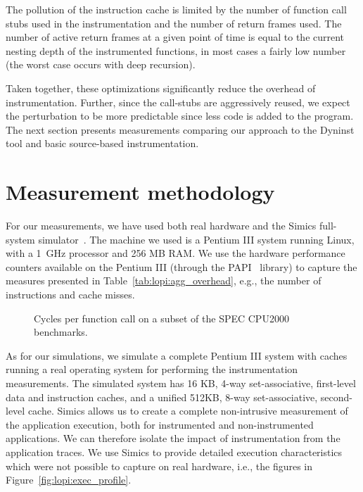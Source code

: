 The pollution of the instruction cache is limited by the number of function
call stubs used in the instrumentation and the number of return frames used.
The number of active return frames at a given point of time is equal to the
current nesting depth of the instrumented functions, in most cases a fairly
low number (the worst case occurs with deep recursion).

Taken together, these optimizations significantly reduce the overhead
of instrumentation. Further, since the call-stubs are aggressively reused, we
expect the perturbation to be more predictable since less code is added to the
program. The next section presents measurements comparing our approach to the
Dyninst tool and basic source-based instrumentation.

\section{Measurement methodology}
\label{sec:lopi:methodology}
For our measurements, we have used both real hardware and the Simics
full-system simulator~\cite{simics}.  The machine we used is a Pentium III
system running Linux, with a 1~GHz processor and 256 MB RAM. We use
the hardware performance counters available on the Pentium III (through the
PAPI~\cite{london2001papi} library) to capture the measures presented in
Table~\ref{tab:lopi:agg_overhead}, e.g., the number of instructions and cache
misses.

\begin{figure*}[htb]
  \begin{center}
  \end{center}
  \caption[Cycles per function call]{Cycles per function call on a subset of
    the SPEC CPU2000 benchmarks.}
  \label{fig:lopi:function_averages}
\end{figure*}

As for our simulations, we simulate a complete Pentium III system with caches
running a real operating system for performing the instrumentation
measurements. The simulated system has 16 KB, 4-way set-associative,
first-level data and instruction caches, and a unified 512KB, 8-way
set-associative, second-level cache. Simics allows us to create a complete
non-intrusive measurement of the application execution, both for instrumented
and non-instrumented applications. We can therefore isolate the impact of
instrumentation from the application traces. We use Simics to provide detailed
execution characteristics which were not possible to capture on real hardware,
i.e., the figures in Figure~\ref{fig:lopi:exec_profile}.

